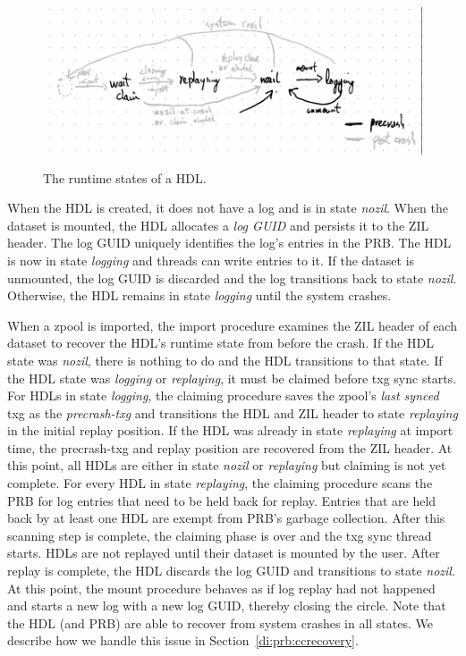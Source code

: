 \documentclass[12pt,a4paper,twoside]{book}
\begin{document}
\begin{figure}[H]
    \centering
    \includegraphics[height=5cm]{fig/prb_hdl_runtime_states}
    \caption{The runtime states of a HDL.}
\end{figure}

When the HDL is created, it does not have a log and is in state \textit{nozil}.
When the dataset is mounted, the HDL allocates a \textit{log GUID} and persists it to the ZIL header.
The log GUID uniquely identifies the log's entries in the PRB.
The HDL is now in state \textit{logging} and threads can write entries to it.
If the dataset is unmounted, the log GUID is discarded and the log transitions back to state \textit{nozil}.
Otherwise, the HDL remains in state \textit{logging} until the system crashes.

When a zpool is imported, the import procedure examines the ZIL header of each dataset to recover the HDL's runtime state from before the crash.
If the HDL state was \textit{nozil}, there is nothing to do and the HDL transitions to that state.
If the HDL state was \textit{logging} or \textit{replaying}, it must be claimed before txg sync starts.
For HDLs in state \textit{logging}, the claiming procedure saves the zpool's \textit{last synced} txg as the \textit{precrash-txg} and transitions the HDL and ZIL header to state \textit{replaying} in the initial replay position.
If the HDL was already in state \textit{replaying} at import time, the precrash-txg and replay position are recovered from the ZIL header.
At this point, all HDLs are either in state \textit{nozil} or \textit{replaying} but claiming is not yet complete.
For every HDL in state \textit{replaying}, the claiming procedure scans the PRB for log entries that need to be held back for replay.
Entries that are held back by at least one HDL are exempt from PRB's garbage collection.
After this scanning step is complete, the claiming phase is over and the txg sync thread starts.
HDLs are not replayed until their dataset is mounted by the user. %
After replay is complete, the HDL discards the log GUID and transitions to state \textit{nozil}.
At this point, the mount procedure behaves as if log replay had not happened and starts a new log with a new log GUID, thereby closing the circle.
Note that the HDL (and PRB) are able to recover from system crashes in all states.
We describe how we handle this issue in Section~\ref{di:prb:ccrecovery}.
\end{document}
